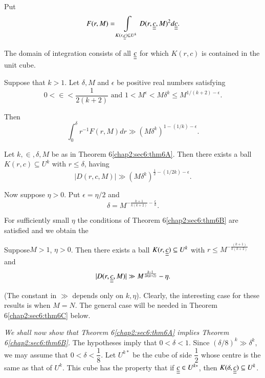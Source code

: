 Put
$$
F(r, M) = \int\limits_{K(r, \underline{\underline{c}}) \subseteq U^{k}} D(r, \underline{\underline{c}}, M)^{2} d\underline{\underline{c}}.
$$

The domain of integration consists of all $\underline{\underline{c}}$ for which $K(r, c)$ is contained in the unit cube.

\begin{theorem}\label{chap2:sec6:thm6A}
Suppose that $k > 1$. Let $\delta, M$ and $\epsilon$ be positive real numbers satisfying
$$
0 < \in < \frac{1}{2(k+2)} \text{ and } 1 < M^{\epsilon} < M\delta^{k} \leq M^{1/(k+2) - \epsilon}.
$$
\end{theorem}

Then
$$
\int_{0}^{\delta} r^{-1} F(r, M) dr \gg (M \delta^{k})^{1-(1/k)- \epsilon}.
$$

\begin{theorem}\label{chap2:sec6:thm6B}
Let $k, \in, \delta, M$ be as in Theorem 6\ref{chap2:sec6:thm6A}. Then there exists a ball $K(r, c) \subseteq U^{k}$ with $r \leq \delta$, having
\begin{equation*}
|D(r, c, M)| \gg (M \delta^{k})^{\frac{1}{2} - (1/2k)-\epsilon} .
\end{equation*}
\end{theorem}

Now suppose $\eta > 0$. Put $\epsilon = \eta/2$ and 
\begin{equation*}
\delta = M^{-\frac{k+1}{k(k+2)} - \frac{\epsilon}{k}}.
\end{equation*}

For sufficiently small $\eta$ the conditions of Theorem 6\ref{chap2:sec6:thm6B} are satisfied and we obtain the
\begin{coro*}
Suppose\pageoriginale $M > 1$, $\eta > 0$. Then there exists a ball $K(r, \underline{\underline{c}}) \subseteq U^{k}$ with $r \leq M^{-\frac{(k+1)}{k(k+2)}}$ and
\begin{equation*}
|D(r, \underline{\underline{c}}, M)| \gg M^{\frac{k-1}{2k(k+2)}} - \eta.
\end{equation*}
\end{coro*}

(The constant in $\gg$ depends only on $k, \eta$). Clearly, the interesting case for these results is when $M = N$. The general case will be needed in Theorem 6\ref{chap2:sec6:thm6C} below.

{\em We shall now show that Theorem 6\ref{chap2:sec6:thm6A} implies Theorem 6\ref{chap2:sec6:thm6B}.} The hypotheses imply that $0 < \delta < 1$. Since $(\delta/8)^{k} \gg \delta^{k}$, we may assume that $0 < \delta < \dfrac{1}{8}$. Let $U^{k*}$ be the cube of side $\dfrac{1}{2}$ whose centre is the same as that of $U^{k}$. This cube has the property that if $\underline{\underline{c}} \in U^{k*}$, then $K(\delta, \underline{\underline{c}}) \subseteq U^{k}$. 

